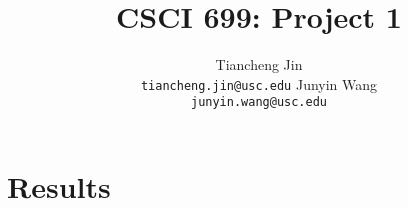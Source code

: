 \documentclass{article}
\title{CSCI 699: Project 1}
\author{%
Tiancheng Jin \\
\texttt{tiancheng.jin@usc.edu} \And
Junyin Wang \\
\texttt{junyin.wang@usc.edu} \\
}
\begin{document}
\maketitle

\begin{abstract}
	
\end{abstract}



\section{Results}
\label{sec:results}












\end{document}
